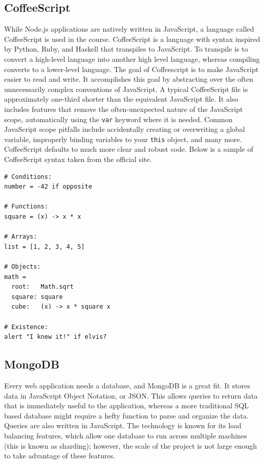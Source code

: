 \documentclass[12pt]{article}
\newcommand{\comment}[1]{{\bf \tt  {#1}}}
\newcommand{\emcomment}[1]{\textcolor{ForestGreen}{\comment{Elena: {#1}}}}
\newcommand{\code}[1]{{\texttt {#1}}}
\begin{document}
\subsection{CoffeeScript}\label{sec:coffee}
While Node.js applications are natively written in JavaScript, a language called CoffeeScript is used in the course. CoffeeScript is a language with syntax inspired by Python, Ruby, and Haskell that transpiles to JavaScript. To transpile is to convert a high-level language into another high level language, whereas compiling converts to a lower-level language. The goal of Coffeescript is to make JavaScript easier to read and write. It accomplishes this goal by abstracting over the often unnecessarily complex conventions of JavaScript. A typical CoffeeScript file is approximately one-third shorter than the equivalent JavaScript file. It also includes features that remove the often-unexpected nature of the JavaScript scope, automatically using the \code{var} keyword where it is needed. Common JavaScript scope pitfalls include accidentally creating or overwriting a global variable, improperly binding variables to your \code{this} object, and many more. CoffeeScript defaults to much more clear and robust code. Below is a sample of CoffeeScript syntax taken from the official site.
\begin{verbatim}
# Conditions:
number = -42 if opposite

# Functions:
square = (x) -> x * x

# Arrays:
list = [1, 2, 3, 4, 5]

# Objects:
math =
  root:   Math.sqrt
  square: square
  cube:   (x) -> x * square x

# Existence:
alert "I knew it!" if elvis?

\end{verbatim}
 


\subsection{MongoDB}\label{sec:mongo}
Every web application needs a database, and MongoDB is a great fit. It stores data in JavaScript Object Notation, or JSON. This allows queries to return data that is immediately useful to the application, whereas a more traditional SQL based database might require a hefty function to parse and organize the data. Queries are also written in JavaScript. The technology is known for its  load balancing features, which allow one database to run across multiple machines (this is known as sharding); however, the scale of the project is not large enough to take advantage of these features.
\end{document}
